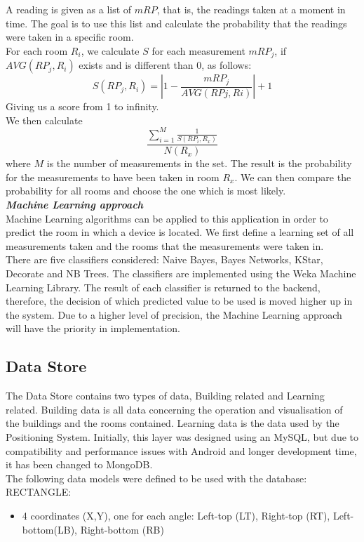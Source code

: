 A reading is given as a list of $mRP$, that is, the readings taken at a moment in time. The goal is to use this list and calculate the probability that the readings were taken in a specific room.\\
For each room $R_i$, we calculate $S$ for each measurement $mRP_j$, if $AVG(RP_j, R_i)$ exists and is different than 0, as follows:
$$S(RP_j, R_i) = | 1 - \frac{mRP_j}{AVG(RPj, Ri)}|+1$$
Giving us a score from 1 to infinity.\\
We then calculate 
$$\frac{\displaystyle\sum_{i=1}^{M} \frac{1}{S(RP_i, R_x)}}{N(R_x)}$$
where $M$ is the number of measurements in the set.
The result is the probability for the measurements to have been taken in room $R_x$.
We can then compare the probability for all rooms and choose the one which is most likely.
\\
\textit{\textbf{Machine Learning approach}}
\\
Machine Learning algorithms can be applied to this application in order to predict the room in which a device is located. We first define a learning set of all measurements taken and the rooms that the measurements were taken in.\\
There are five classifiers considered:
Naive Bayes, Bayes Networks, KStar, Decorate and NB Trees. The classifiers are implemented using the Weka Machine Learning Library. The result of each classifier is returned to the backend, therefore, the decision of which predicted value to be used is moved higher up in the system.
Due to a higher level of precision, the Machine Learning approach will have the priority in implementation.




\subsection{Data Store}
The Data Store contains two types of data, Building related and Learning related. 
Building data is all data concerning the operation and visualisation of the buildings and the rooms contained. Learning data is the data used by the Positioning System.
Initially, this layer was designed using an MySQL, but due to compatibility and performance issues with Android and longer development time, it has been changed to MongoDB.
\\
The following data models were defined to be used with the database:
\\
RECTANGLE:	
\begin{itemize}
	\item 4 coordinates (X,Y), one for each angle: Left-top (LT), Right-top (RT), Left-bottom(LB), Right-bottom (RB)
\end{itemize}


